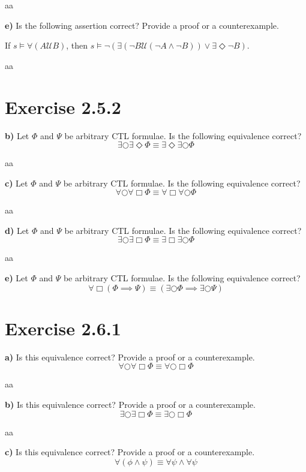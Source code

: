 \documentclass[titlepage, letterpaper, fleqn]{article}
\newcommand{\until}{\mathscr{U}}
\begin{document}
aa

{\large \textbf{e)} Is the following assertion correct? Provide a proof or a counterexample.

If \(s \models \forall (A \until B)\), then \(s \models \neg (\exists (\neg B \until(\neg A \wedge \neg B)) \vee \exists \Diamond \neg B)\).}

aa

\section{Exercise 2.5.2}

{\large \textbf{b)} Let \(\Phi\) and \(\Psi\) be arbitrary CTL formulae. Is the following equivalence correct?
\[\exists \bigcirc \exists \Diamond \Phi \equiv \exists \Diamond \exists \bigcirc \Phi\]}

aa

{\large \textbf{c)} Let \(\Phi\) and \(\Psi\) be arbitrary CTL formulae. Is the following equivalence correct?
\[\forall \bigcirc \forall \Box \Phi \equiv \forall \Box \forall \bigcirc \Phi\]}

aa

{\large \textbf{d)} Let \(\Phi\) and \(\Psi\) be arbitrary CTL formulae. Is the following equivalence correct?
\[\exists \bigcirc \exists \Box \Phi \equiv \exists \Box \exists \bigcirc \Phi\]}

aa

{\large \textbf{e)} Let \(\Phi\) and \(\Psi\) be arbitrary CTL formulae. Is the following equivalence correct?
\[\forall \Box(\Phi \implies \Psi) \equiv (\exists \bigcirc \Phi \implies \exists \bigcirc \Psi)\]}

\section{Exercise 2.6.1}

{\large \textbf{a)} Is this equivalence correct? Provide a proof or a counterexample.
\[\forall \bigcirc \forall \Box \Phi \equiv \forall \bigcirc \Box \Phi\]}

aa

{\large \textbf{b)} Is this equivalence correct? Provide a proof or a counterexample.
\[\exists \bigcirc \exists \Box \Phi \equiv \exists \bigcirc \Box \Phi\]}

aa

{\large \textbf{c)} Is this equivalence correct? Provide a proof or a counterexample.
\[\forall (\phi \wedge \psi) \equiv \forall \psi \wedge \forall \psi\]}
\end{document}
